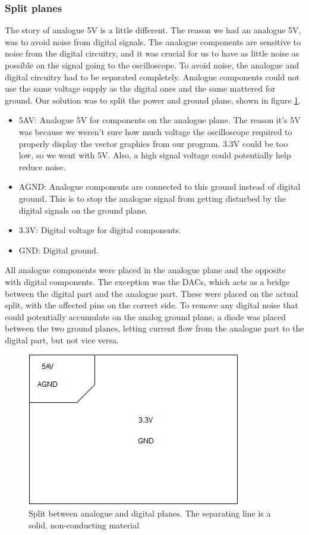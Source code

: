 \begin{itemize}
\subsubsection{Split planes}
The story of analogue 5V is a little different. The reason we had an analogue 5V, was to avoid noise from digital signals. The analogue components are sensitive to noise from the digital circuitry, and it was crucial for us to have as little noise as possible on the signal going to the oscilloscope. 
To avoid noise, the analogue and digital circuitry had to be separated completely. Analogue components could not use the same voltage supply as the digital ones and the same mattered for ground.
\newline
\newline
Our solution was to split the power and ground plane, shown in figure \ref{fig:Split planes}. 
\begin{itemize}
\item 5AV: Analogue 5V for components on the analogue plane. The reason it's 5V was because we weren't sure how much voltage the oscilloscope required to properly display the vector graphics from our program. 3.3V could be too low, so we went with 5V. Also, a high signal voltage could potentially help reduce noise.
\item AGND: Analogue components are connected to this ground instead of digital ground. This is to stop the analogue signal from getting disturbed by the digital signals on the ground plane.
\item 3.3V: Digital voltage for digital components.
\item GND: Digital ground.
\end{itemize}
All analogue components were placed in the analogue plane and the opposite with digital components. The exception was the DACs, which acts as a bridge between the digital part and the analogue part. These were placed on the actual split, with the affected pins on the correct side.
\newline
To remove any digital noise that could potentially accumulate on the analog ground plane, a diode was placed between the two ground planes, letting current flow from the analogue part to the digital part, but not vice versa.

\begin{figure}[h!]
\centering
\includegraphics[scale = 0.6]{images/Split_planes.png}
\caption{Split between analogue and digital planes. The separating line is a solid, non-conducting material}
\label{fig:Split planes}
\end{figure}


\end{itemize}

